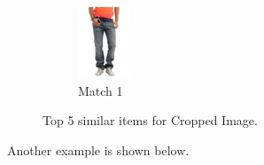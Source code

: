 \begin{figure}[H]
\begin{subfigure}[b]{0.19\textwidth}
      \includegraphics[width=\textwidth]{images/output5.jpeg}
      \caption{Match 1}
  \end{subfigure}
  \caption{Top 5 similar items for Cropped Image.}
  \label{fig:similar_items_1}
\end{figure}

Another example is shown below.

